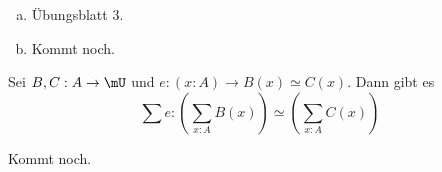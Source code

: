 \begin{beweis}
  \begin{enumerate}[(a)]
  \item Übungsblatt 3.
  \item Kommt noch.
  \end{enumerate}
\end{beweis}

\begin{lemma}
  Sei $B,C:A\to\mU$ und $e:(x:A)\to B(x)\simeq C(x)$.
  Dann gibt es
  \[\sum e : \left(\sum_{x:A}B(x)\right)\simeq \left(\sum_{x:A}C(x)\right)\]
\end{lemma}

\begin{beweis}
  Kommt noch.
\end{beweis}

